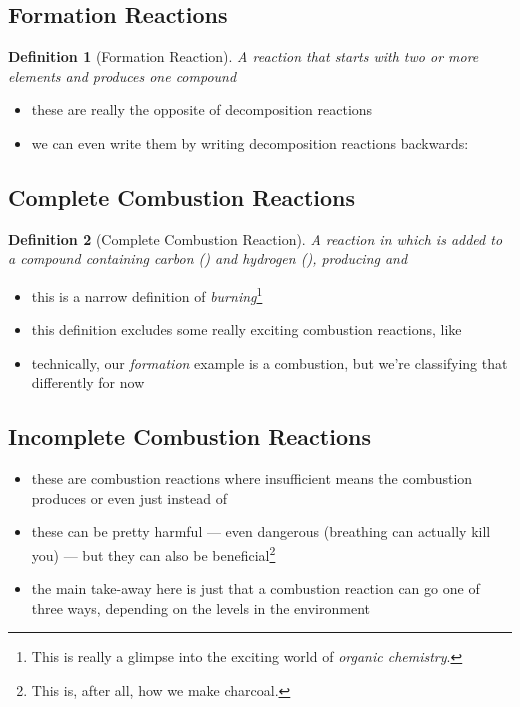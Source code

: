 \documentclass[11pt, oneside]{article}   	%
\newtheorem{definition}{Definition}
\begin{document}
\subsection{Formation Reactions}

\begin{definition}[Formation Reaction]\label{defn:reaction:formation}
A reaction that starts with two or more elements and produces one compound
\end{definition}
\begin{itemize}
\item these are really the opposite of decomposition reactions
\item we can even write them by writing decomposition reactions backwards:  
\end{itemize}


\subsection{Complete Combustion Reactions}

\begin{definition}[Complete Combustion Reaction]\label{defn:reaction:complete-combustion}
A reaction in which  is added to a compound containing carbon () and hydrogen (), producing  and 
\end{definition}
\begin{itemize}
\item this is a narrow definition of \emph{burning}\footnote{This is really a glimpse into the exciting world of \emph{organic chemistry}.}
\item this definition excludes some really exciting combustion reactions, like 
\item technically, our \emph{formation} example is a combustion, but we're classifying that differently for now
\end{itemize}


\subsection{Incomplete Combustion Reactions}

\begin{itemize}
\item these are combustion reactions where insufficient  means the combustion produces  or even just  instead of 
\item these can be pretty harmful --- even dangerous (breathing  can actually kill you) --- but they can also be beneficial\footnote{This is, after all, how we make charcoal.}
\item the main take-away here is just that a combustion reaction can go one of three ways, depending on the  levels in the environment
\end{itemize}
\end{document}
